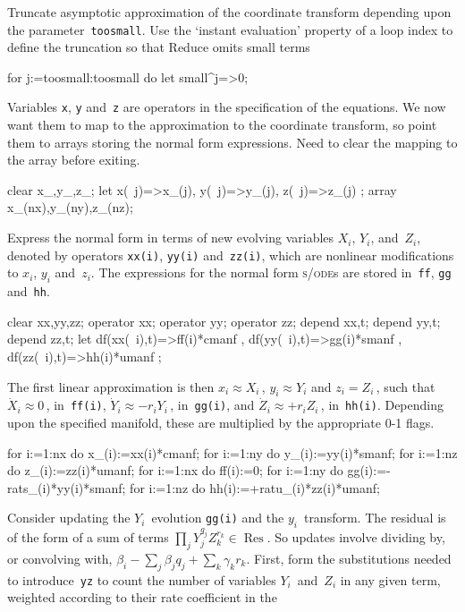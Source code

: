 \documentclass[11pt,a5paper]{article}
\newcommand{\res}{\operatorname{Res}}
\def\sde{\textsc{s/ode}}
\begin{document}
Truncate asymptotic approximation of the coordinate
transform depending upon the parameter~\verb|toosmall|. Use
the `instant evaluation' property of a loop index to define
the truncation so that Reduce omits small terms 
\begin{reduce}
for j:=toosmall:toosmall do let small^j=>0;
\end{reduce}

Variables \verb|x|, \verb|y| and~\verb|z| are operators in
the specification of the equations. We now want them to map
to the approximation to the coordinate transform, so point
them to arrays storing the normal form expressions.  Need to
clear the mapping to the array before exiting.
\begin{reduce}
clear x_,y_,z_;
let { x(~j)=>x_(j), y(~j)=>y_(j), z(~j)=>z_(j) };
array x_(nx),y_(ny),z_(nz);
\end{reduce}

Express the normal form in terms of new evolving variables
$X_i$, $Y_i$, and~$Z_i$, denoted by operators \verb|xx(i)|,
\verb|yy(i)| and~\verb|zz(i)|, which are nonlinear
modifications to $x_i$, $y_i$ and~$z_i$. The expressions for
the normal form \sde{}s are stored in~\verb|ff|, \verb|gg|
and~\verb|hh|.
\begin{reduce}
clear xx,yy,zz;
operator xx; operator yy; operator zz;
depend xx,t; depend yy,t; depend zz,t;
let { df(xx(~i),t)=>ff(i)*cmanf 
    , df(yy(~i),t)=>gg(i)*smanf
    , df(zz(~i),t)=>hh(i)*umanf };
\end{reduce}

The first linear approximation is then $x_i\approx X_i$\,,
$y_i\approx Y_i$ and $z_i=Z_i$\,, such that $\dot X_i\approx
0$\,, in~\verb|ff(i)|, $\dot Y_i\approx -r_iY_i$\,,
in~\verb|gg(i)|, and  $\dot Z_i\approx +r_iZ_i$\,,
in~\verb|hh(i)|. Depending upon the specified manifold,
these are multiplied by the appropriate 0-1 flags.
\begin{reduce}
for i:=1:nx do x_(i):=xx(i)*cmanf;
for i:=1:ny do y_(i):=yy(i)*smanf;
for i:=1:nz do z_(i):=zz(i)*umanf;
for i:=1:nx do ff(i):=0;
for i:=1:ny do gg(i):=-rats_(i)*yy(i)*smanf;
for i:=1:nz do hh(i):=+ratu_(i)*zz(i)*umanf;
\end{reduce}

Consider updating the $Y_i$~evolution \verb|gg(i)| and the
$y_i$~transform.  The residual is of the form of a sum of
terms $\prod_{j}Y_j^{q_j}Z_k^{r_k} \in\res$. So updates
involve dividing by, or convolving with, $\beta_i -\sum_j
\beta_j q_j +\sum_k \gamma_k r_k$. First, form the
substitutions needed to introduce~\verb|yz| to count the
number of variables $Y_i$~and~$Z_i$ in any given term,
weighted according to their rate coefficient in the
\end{document}
